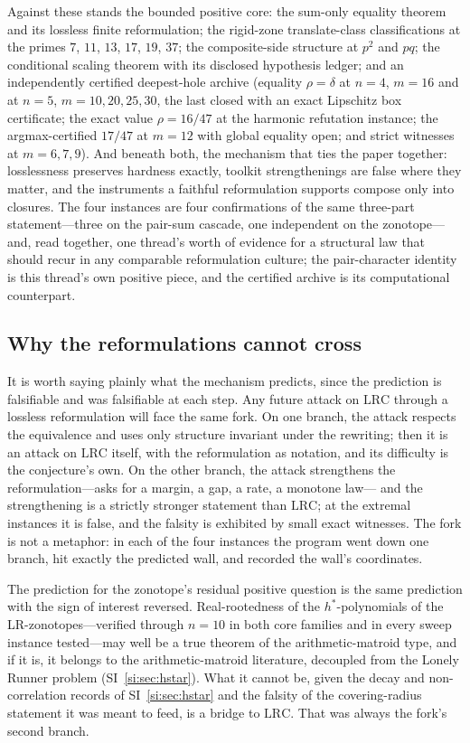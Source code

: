 \documentclass[11pt,a4paper]{article}
\numberwithin{equation}{section}
\theoremstyle{plain}
\theoremstyle{definition}
\theoremstyle{remark}
\newcommand{\lrc}{\mathrm{LRC}}
\begin{document}
Against these stands the bounded positive core: the sum-only equality
theorem and its lossless finite reformulation; the rigid-zone
translate-class classifications at the primes $7$, $11$, $13$, $17$,
$19$, $37$; the composite-side structure at $p^2$ and $pq$; the
conditional scaling theorem with its disclosed hypothesis ledger; and an
independently certified deepest-hole archive (equality $\rho=\delta$ at
$n=4$, $m=16$ and at $n=5$, $m=10,20,25,30$, the last closed with an
exact Lipschitz box certificate; the exact value $\rho=16/47$ at the
harmonic refutation instance; the argmax-certified $17/47$ at $m=12$
with global equality open; and strict witnesses at $m=6,7,9$). And
beneath both, the mechanism that ties the paper together: losslessness
preserves hardness exactly, toolkit strengthenings are false where they
matter, and the instruments a faithful reformulation supports compose
only into closures. The four instances are four confirmations of the
same three-part statement---three on the pair-sum cascade, one
independent on the zonotope---and, read together, one thread's worth of
evidence for a structural law that should recur in any comparable
reformulation culture; the pair-character identity is this thread's own
positive piece, and the certified archive is its computational
counterpart.

\subsection{Why the reformulations cannot cross}

It is worth saying plainly what the mechanism predicts, since the
prediction is falsifiable and was falsifiable at each step. Any future
attack on $\lrc$ through a lossless reformulation will face the same
fork. On one branch, the attack respects the equivalence and uses only
structure invariant under the rewriting; then it is an attack on
$\lrc$ itself, with the reformulation as notation, and its difficulty
is the conjecture's own. On the other branch, the attack strengthens
the reformulation---asks for a margin, a gap, a rate, a monotone law---
and the strengthening is a strictly stronger statement than $\lrc$;
at the extremal instances it is false, and the falsity is exhibited by
small exact witnesses. The fork is not a metaphor: in each of the four
instances the program went down one branch, hit exactly the predicted
wall, and recorded the wall's coordinates.

The prediction for the zonotope's residual positive question is the same
prediction with the sign of interest reversed. Real-rootedness of the
$h^*$-polynomials of the LR-zonotopes---verified through $n=10$ in both
core families and in every sweep instance tested---may well be a true
theorem of the arithmetic-matroid type, and if it is, it belongs to the
arithmetic-matroid literature, decoupled from the Lonely Runner problem
(SI~\ref{si:sec:hstar}). What it cannot be, given the decay and
non-correlation records of SI~\ref{si:sec:hstar} and the falsity of
the covering-radius statement it was meant to feed, is a bridge to
$\lrc$. That was always the fork's second branch.
\end{document}
